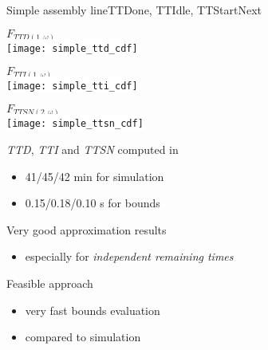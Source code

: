    \begin{frame}{Simple assembly line}{TTDone, TTIdle, TTStartNext}
      \begin{minipage}{0.3\textwidth}
        \begin{center}
          {\tiny $F_{TTD(1,\omega)}$}\\
          \colorbox{white}{\texttt{[image: simple\_ttd\_cdf]}}
        \end{center}
      \end{minipage}
      \begin{minipage}{0.3\textwidth}
        \begin{center}
          {\tiny $F_{TTI(1,\omega)}$}\\
          \colorbox{white}{\texttt{[image: simple\_tti\_cdf]}}
        \end{center}
      \end{minipage}
      \begin{minipage}{0.3\textwidth}
        \begin{center}
          {\tiny $F_{TTSN(2,\omega)}$}\\
          \colorbox{white}{\texttt{[image: simple\_ttsn\_cdf]}}
        \end{center}
      \end{minipage}
      
      \begin{minipage}{0.5\textwidth}
        \textit{TTD}, \textit{TTI} and \textit{TTSN} computed in
        \begin{itemize}
          \item 41/45/42 min for simulation
          \item 0.15/0.18/0.10 s for bounds
        \end{itemize}
      \end{minipage}
      \begin{minipage}{0.45\textwidth}
        \vspace{2em}
        Very good approximation results
        \begin{itemize}
          \item especially for \textit{independent remaining times}
        \end{itemize}
        Feasible approach
        \begin{itemize}
          \item very fast bounds evaluation
          \item compared to simulation
        \end{itemize}
      \end{minipage}
    \end{frame}
    
